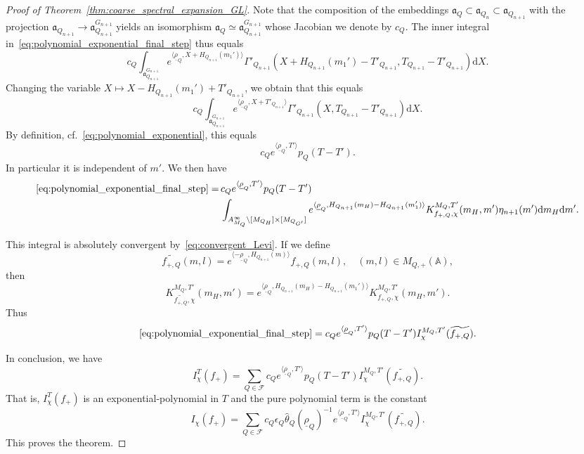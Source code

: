 \documentclass[letterpaper,11pt]{amsart}
\newcommand{\fa}{\mathfrak{a}}
\newcommand{\bA}{\mathbb{A}}
\newcommand{\cF}{\mathcal{F}}
\newcommand{\rd}{\mathrm{d}}
\newcommand{\<}{\negthickspace}
\theoremstyle{definition}
\theoremstyle{plain}
\theoremstyle{remark}
\numberwithin{equation}{section}
\begin{document}
\begin{proof}[Proof of Theorem~\ref{thm:coarse_spectral_expansion_GL}]
Note that the composition of the embeddings $\fa_{Q} \subset \fa_{Q_n} \subset \fa_{Q_{n+1}}$ with the projection $\fa_{Q_{n+1}}\to
\fa^{G_{n+1}}_{Q_{n+1}}$ yields an isomorphism $\fa_{Q} \simeq
\fa^{G_{n+1}}_{Q_{n+1}}$ whose Jacobian we denote by $c_Q$. The inner integral
in~\eqref{eq:polynomial_exponential_final_step} thus equals
    \[
    c_Q \int_{\fa_{Q_{n+1}}^{G_{n+1}}}
    e^{\langle \underline{\rho}_Q, X + H_{Q_{n+1}}(m_1') \rangle}
    \Gamma'_{Q_{n+1}}(X + H_{Q_{n+1}}(m_1')-T'_{Q_{n+1}}, T_{Q_{n+1}}-T'_{Q_{n+1}})
    \rd X.
    \]
Changing the variable $X \mapsto X - H_{Q_{n+1}}(m_1') + T'_{Q_{n+1}}$, we obtain that
this equals
    \[
    c_Q \int_{\fa_{Q_{n+1}}^{G_{n+1}}}
    e^{\langle \underline{\rho}_Q, X + T'_{Q_{n+1}} \rangle}
    \Gamma'_{Q_{n+1}}(X, T_{Q_{n+1}}-T'_{Q_{n+1}})
    \rd X.
    \]
By definition, cf.~\eqref{eq:polynomial_exponential}, this equals
    \[
    c_Q e^{\langle \underline{\rho}_Q, T' \rangle} p_Q(T-T').
    \]
In particular it is independent of $m'$. We then have
    \[
    \begin{aligned}
    \eqref{eq:polynomial_exponential_final_step} = \,
    &c_Q e^{\langle \underline{\rho}_Q, T' \rangle} p_Q(T-T') \\
    &\int_{A_{M_Q}^\infty \backslash [M_{Q_H}] \times [M_{Q_{G'}}]}
    e^{ \langle \underline{\rho}_Q, H_{Q_{n+1}}(m_H)-H_{Q_{n+1}}(m_1') \rangle}
    K_{f_{+,Q},\chi}^{M_Q,T'}(m_H,m') \eta_{n+1}(m') \rd m_H \rd m'.
    \end{aligned}
    \]

This integral is absolutely convergent by~\eqref{eq:convergent_Levi}. If we
define
    \[
    \widetilde{f_{+,Q}}(m,l)= e^{ \langle -\underline{\rho}_Q,
    H_{Q_{n+1}}(m)\rangle} f_{+,Q}(m,l), \quad (m, l) \in M_{Q, +}(\bA),
    \]
then
    \begin{equation}    \label{eq:distribution_parabolic_descent_normalized}
    K_{\widetilde{f_{+,Q}},\chi}^{M_Q,T'}(m_H,m')
    = e^{\langle \underline{\rho}_Q, H_{Q_{n+1}}(m_H)-H_{Q_{n+1}}(m_1') \rangle}
    K_{f_{+,Q},\chi}^{M_Q,T'}(m_H,m').
    \end{equation}
Thus
    \[
    \eqref{eq:polynomial_exponential_final_step} =
    c_Q e^{\langle \underline{\rho}_Q, T' \rangle} p_Q(T-T')
    I_{\chi}^{M_Q,T'}(\widetilde{f_{+,Q}}).
    \]



In conclusion, we have
    \[
    I_\chi^T(f_+) =
    \sum_{Q \in \cF}
    c_Q e^{\langle \underline{\rho}_Q,T' \rangle} p_Q(T-T')
    I_{\chi}^{M_Q,T'}(\widetilde{f_{+,Q}}).
    \]
That is, $I_\chi^T(f_+)$ is an exponential-polynomial in $T$ and the pure
polynomial term is the constant
    \begin{equation} \label{I_chi_explicit}
    I_\chi(f_+)= \sum_{Q \in \cF}
    c_Q \epsilon_Q \widehat{\theta}_Q(\underline{\rho}_Q)^{-1}
    e^{\langle \underline{\rho}_Q,T' \rangle}
    I_{\chi}^{M_Q,T'}(\widetilde{f_{+,Q}}) .
    \end{equation}
This proves the theorem.
\end{proof}
\end{document}
